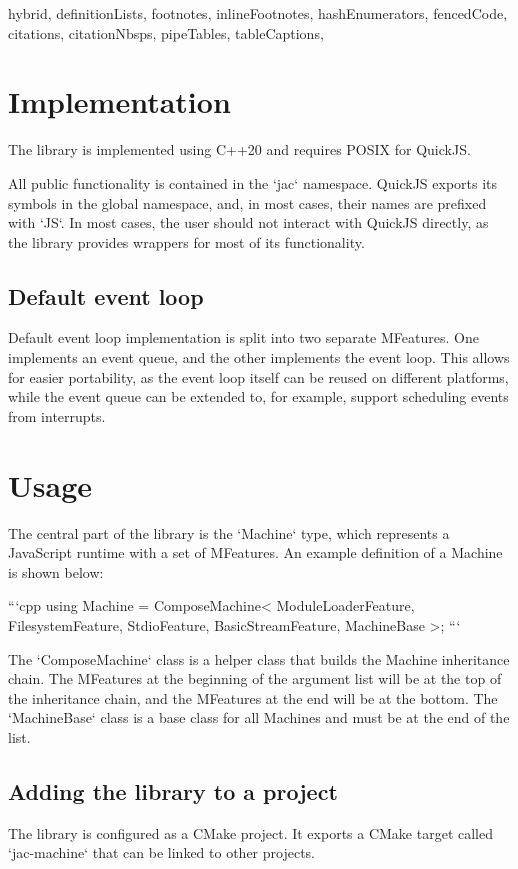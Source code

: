 \begin{markdown*}{%
  hybrid,
  definitionLists,
  footnotes,
  inlineFootnotes,
  hashEnumerators,
  fencedCode,
  citations,
  citationNbsps,
  pipeTables,
  tableCaptions,
}
\section{Implementation}

The library is implemented using C++20 and requires POSIX for QuickJS.

All public functionality is contained in the `jac` namespace. QuickJS exports its symbols in the global namespace, and, in most cases, their names are prefixed with `JS`. In most cases, the user should not interact with QuickJS directly, as the library provides wrappers for most of its functionality.

\subsection{Default event loop}

Default event loop implementation is split into two separate MFeatures. One implements an event queue, and the other implements the event loop. This allows for easier portability, as the event loop itself can be reused on different platforms, while the event queue can be extended to, for example, support scheduling events from interrupts.


\section{Usage}

The central part of the library is the `Machine` type, which represents a JavaScript runtime with a set of MFeatures. An example definition of a Machine is shown below:

```cpp
using Machine = ComposeMachine<
    ModuleLoaderFeature,
    FilesystemFeature,
    StdioFeature,
    BasicStreamFeature,
    MachineBase
>;
```

The `ComposeMachine` class is a helper class that builds the Machine inheritance chain. The MFeatures at the beginning of the argument list will be at the top of the inheritance chain, and the MFeatures at the end will be at the bottom. The `MachineBase` class is a base class for all Machines and must be at the end of the list.

\subsection{Adding the library to a project}

The library is configured as a CMake project. It exports a CMake target called `jac-machine` that can be linked to other projects.


\end{markdown*}
